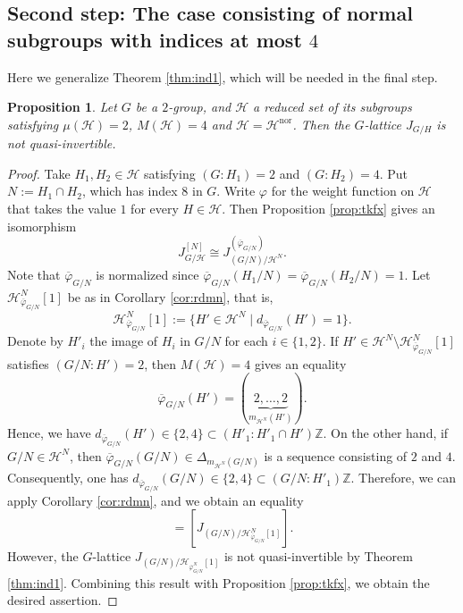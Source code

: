 \documentclass[12pt]{amsart}
\theoremstyle{plain}
\newtheorem{prop}[thm]{Proposition}
\theoremstyle{definition}
\numberwithin{thm}{section}
\numberwithin{equation}{section}
\newcommand{\Z}{\mathbb{Z}}
\newcommand{\cH}{\mathcal{H}}
\DeclareMathOperator{\nor}{nor}
\begin{document}
\subsection{Second step: The case consisting of normal subgroups with indices at most $4$}\label{ssec:tgs2}

Here we generalize Theorem \ref{thm:ind1}, which will be needed in the final step. 

\begin{prop}\label{prop:anm2}
Let $G$ be a $2$-group, and $\cH$ a reduced set of its subgroups satisfying $\mu(\cH)=2$, $M(\cH)=4$ and $\cH=\cH^{\nor}$. Then the $G$-lattice $J_{G/H}$ is not quasi-invertible. 
\end{prop}

\begin{proof}
Take $H_{1},H_{2}\in \cH$ satisfying $(G:H_{1})=2$ and $(G:H_{2})=4$. Put $N:=H_{1}\cap H_{2}$, which has index $8$ in $G$. Write $\varphi$ for the weight function on $\cH$ that takes the value $1$ for every $H\in \cH$. Then Proposition \ref{prop:tkfx} gives an isomorphism
\begin{equation*}
J_{G/\cH}^{[N]}\cong J_{(G/N)/\cH^{N}}^{(\overline{\varphi}_{G/N})}. 
\end{equation*}
Note that $\overline{\varphi}_{G/N}$ is normalized since $\overline{\varphi}_{G/N}(H_{1}/N)=\overline{\varphi}_{G/N}(H_{2}/N)=1$. Let $\cH_{\overline{\varphi}_{G/N}}^{N}[1]$ be as in Corollary \ref{cor:rdmn}, that is,
\begin{equation*}
    \cH_{\overline{\varphi}_{G/N}}^{N}[1]:=\{H'\in \cH^{N} \mid d_{\overline{\varphi}_{G/N}}(H')=1\}. 
\end{equation*}
Denote by $H'_{i}$ the image of $H_{i}$ in $G/N$ for each $i\in \{1,2\}$. If $H'\in \cH^{N}\setminus \cH_{\overline{\varphi}_{G/N}}^{N}[1]$ satisfies $(G/N:H')=2$, then $M(\cH)=4$ gives an equality
\begin{equation*}
\overline{\varphi}_{G/N}(H')=(\underbrace{2,\ldots,2}_{m_{\cH^{N}}(H')}). 
\end{equation*}
Hence, we have $d_{\overline{\varphi}_{G/N}}(H')\in \{2,4\}\subset (H'_{1}:H'_{1}\cap H')\Z$. On the other hand, if $G/N\in \cH^{N}$, then $\overline{\varphi}_{G/N}(G/N)\in \Delta_{m_{\cH^{N}}(G/N)}$ is a sequence consisting of $2$ and $4$. Consequently, one has $d_{\overline{\varphi}_{G/N}}(G/N)\in \{2,4\}\subset (G/N:H'_{1})\Z$. Therefore, we can apply Corollary \ref{cor:rdmn}, and we obtain an equality
\begin{equation*}
[J_{(G/N)/\cH^{N}}^{(\overline{\varphi}_{G/N})}]=[J_{(G/N)/\cH_{\overline{\varphi}_{G/N}}^{N}[1]}]. 
\end{equation*}
However, the $G$-lattice $J_{(G/N)/\cH_{\overline{\varphi}_{G/N}^{N}}[1]}$ is not quasi-invertible by Theorem \ref{thm:ind1}. Combining this result with Proposition \ref{prop:tkfx}, we obtain the desired assertion. 
\end{proof}
\end{document}
